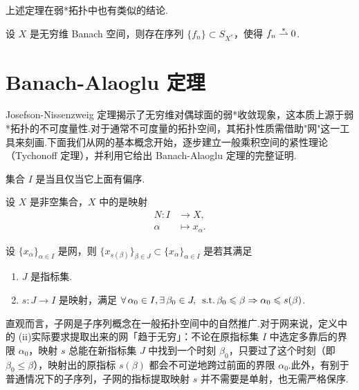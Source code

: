 上述定理在弱*拓扑中也有类似的结论.

\begin{theorem}
    设 $X$ 是无穷维 Banach 空间，则存在序列 $\{f_n\} \subset S_{X^*}$，使得 $f_n \stackrel{*}{\rightharpoonup} 0$.
\end{theorem}



\section{Banach-Alaoglu 定理}

Josefson-Nissenzweig 定理揭示了无穷维对偶球面的弱*收敛现象，这本质上源于弱*拓扑的不可度量性.对于通常不可度量的拓扑空间，其拓扑性质需借助"网"这一工具来刻画.下面我们从网的基本概念开始，逐步建立一般乘积空间的紧性理论（Tychonoff 定理），并利用它给出 Banach-Alaoglu 定理的完整证明.

\begin{definition}[指标集]
    集合 $I$ 是当且仅当它上面有偏序.
\end{definition}

\begin{definition}[网]
    设 $X$ 是非空集合，$X$ 中的是映射
    \begin{align*}
    N: I &\to X,\\[-3pt]
    \alpha &\mapsto x_\alpha.
    \end{align*}
\end{definition}

\begin{definition}[子网]
    设 $\{x_\alpha\}_{\alpha\in I}$ 是网，则 $\{x_{s(\beta)}\}_{\beta\in J}\subset \{x_\alpha\}_{\alpha\in I}$ 是若其满足
    \begin{enumerate}
        \item[(i)] $J$ 是指标集.
        \item[(ii)] $s: J\to I$ 是映射，满足 $\forall\, \alpha_0\in I, \exists\, \beta_0\in J,\ \operatorname{\,\text{s.t.}} \beta_0\leqslant \beta \Rightarrow \alpha_0\leqslant s(\beta)$.
    \end{enumerate}
\end{definition}

直观而言，子网是子序列概念在一般拓扑空间中的自然推广.对于网来说，定义中的 (ii)实际要求提取出来的网「趋于无穷」：不论在原指标集 $I$ 中选定多靠后的界限 $\alpha_0$，映射 $s$ 总能在新指标集 $J$ 中找到一个时刻 $\beta_0$，只要过了这个时刻（即 $\beta_0 \leq \beta$），映射出的原指标 $s(\beta)$ 都会不可逆地跨过前面的界限 $\alpha_0$.此外，有别于普通情况下的子序列，子网的指标提取映射 $s$ 并不需要是单射，也无需严格保序.

